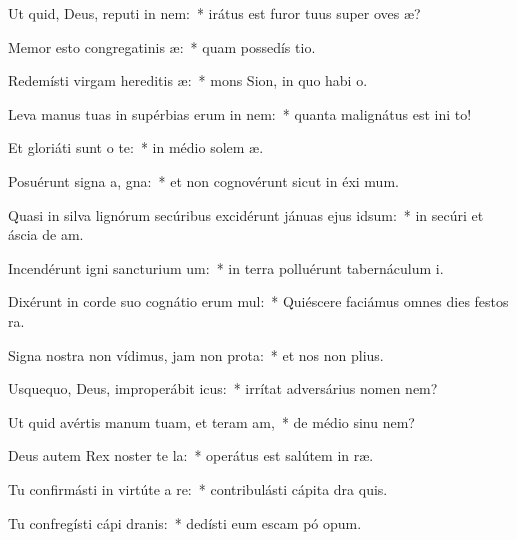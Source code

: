 \item Ut quid, Deus, reputi in nem:~* irátus est furor tuus super oves  æ?
\item Memor esto congregatinis æ:~* quam possedís  tio.
\item Redemísti virgam hereditis æ:~* mons Sion, in quo habi  o.
\item Leva manus tuas in supérbias erum in nem:~* quanta malignátus est ini  to!
\item Et gloriáti sunt  o te:~* in médio solem æ.
\item Posuérunt signa a, gna:~* et non cognovérunt sicut in éxi  mum.
\item Quasi in silva lignórum secúribus excidérunt jánuas ejus  idsum:~* in secúri et áscia de am.
\item Incendérunt igni sancturium um:~* in terra polluérunt tabernáculum  i.
\item Dixérunt in corde suo cognátio erum mul:~* Quiéscere faciámus omnes dies festos   ra.
\item Signa nostra non vídimus, jam non  prota:~* et nos non  plius.
\item Usquequo, Deus, improperábit icus:~* irrítat adversárius nomen   nem?
\item Ut quid avértis manum tuam, et teram am,~* de médio sinu   nem?
\item Deus autem Rex noster te la:~* operátus est salútem in  ræ.
\item Tu confirmásti in virtúte a re:~* contribulásti cápita dra  quis.
\item Tu confregísti cápi dranis:~* dedísti eum escam pó opum.
